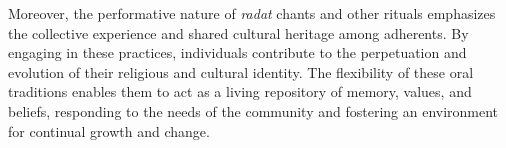 Moreover, the performative nature of \emph{radat} chants and other rituals emphasizes the collective experience and shared cultural heritage among adherents. By engaging in these practices, individuals contribute to the perpetuation and evolution of their religious and cultural identity. The flexibility of these oral traditions enables them to act as a living repository of memory, values, and beliefs, responding to the needs of the community and fostering an environment for continual growth and change.



